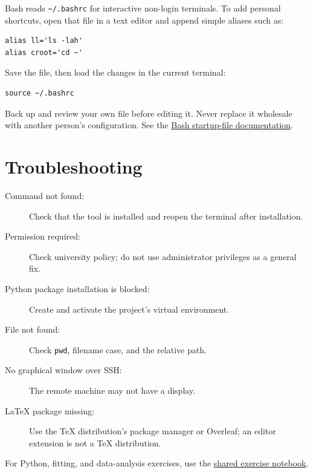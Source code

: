 \documentclass[11pt]{article}
\begin{document}
Bash reads \texttt{\textasciitilde/.bashrc} for interactive non-login
terminals. To add personal shortcuts, open that file in a text editor and
append simple aliases such as:
\begin{lstlisting}
alias ll='ls -lah'
alias croot='cd ~'
\end{lstlisting}
Save the file, then load the changes in the current terminal:
\begin{lstlisting}
source ~/.bashrc
\end{lstlisting}
Back up and review your own file before editing it. Never replace it wholesale
with another person's configuration. See the
\href{https://www.gnu.org/software/bash/manual/html_node/Bash-Startup-Files.html}{Bash
startup-file documentation}.

\section{Troubleshooting}
\begin{description}
\item[Command not found:] Check that the tool is installed and reopen the
terminal after installation.
\item[Permission required:] Check university policy; do not use administrator
privileges as a general fix.
\item[Python package installation is blocked:] Create and activate the
project's virtual environment.
\item[File not found:] Check \texttt{pwd}, filename case, and the relative path.
\item[No graphical window over SSH:] The remote machine may not have a display.
\item[LaTeX package missing:] Use the TeX distribution's package manager or
Overleaf; an editor extension is not a TeX distribution.
\end{description}

\noindent For Python, fitting, and data-analysis exercises, use the
\href{../../Example_Code/Exersize.ipynb}{shared exercise notebook}.
\end{document}
